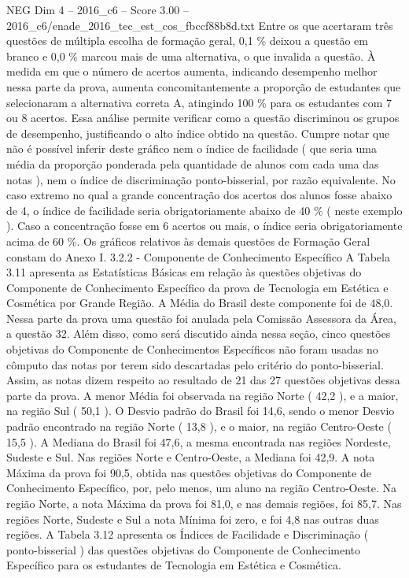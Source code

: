 \begin{textsample}{NEG Dim 4 – 2016\_c6 – Score 3.00 – 2016\_c6/enade\_2016\_tec\_est\_cos\_fbccf88b8d.txt}
Entre os que acertaram três questões de múltipla escolha de formação geral, 0,1 \% deixou a questão em branco e 0,0 \% marcou mais de uma alternativa, o que invalida a questão.
À medida em que o número de acertos aumenta, indicando desempenho melhor nessa parte da prova, aumenta concomitantemente a proporção de estudantes que selecionaram a alternativa correta A, atingindo 100 \% para os estudantes com 7 ou 8 acertos.
Essa análise permite verificar como a questão discriminou os grupos de desempenho, justificando o alto índice obtido na questão.
Cumpre notar que não é possível inferir deste gráfico nem o índice de facilidade ( que seria uma média da proporção ponderada pela quantidade de alunos com cada uma das notas ), nem o índice de discriminação ponto-bisserial, por razão equivalente.
No caso extremo no qual a grande concentração dos acertos dos alunos fosse abaixo de 4, o índice de facilidade seria obrigatoriamente abaixo de 40 \% ( neste exemplo ).
Caso a concentração fosse em 6 acertos ou mais, o índice seria obrigatoriamente acima de 60 \%.
Os gráficos relativos às demais questões de Formação Geral constam do Anexo I. 3.2.2 - Componente de Conhecimento Específico A Tabela 3.11 apresenta as Estatísticas Básicas em relação às questões objetivas do Componente de Conhecimento Específico da prova de Tecnologia em Estética e Cosmética por Grande Região.
A Média do Brasil deste componente foi de 48,0.
Nessa parte da prova uma questão foi anulada pela Comissão Assessora da Área, a questão 32.
Além disso, como será discutido ainda nessa seção, cinco questões objetivas do Componente de Conhecimentos Específicos não foram usadas no cômputo das notas por terem sido descartadas pelo critério do ponto-bisserial.
Assim, as notas dizem respeito ao resultado de 21 das 27 questões objetivas dessa parte da prova.
A menor Média foi observada na região Norte ( 42,2 ), e a maior, na região Sul ( 50,1 ).
O Desvio padrão do Brasil foi 14,6, sendo o menor Desvio padrão encontrado na região Norte ( 13,8 ), e o maior, na região Centro-Oeste ( 15,5 ).
A Mediana do Brasil foi 47,6, a mesma encontrada nas regiões Nordeste, Sudeste e Sul.
Nas regiões Norte e Centro-Oeste, a Mediana foi 42,9.
A nota Máxima da prova foi 90,5, obtida nas questões objetivas do Componente de Conhecimento Específico, por, pelo menos, um aluno na região Centro-Oeste.
Na região Norte, a nota Máxima da prova foi 81,0, e nas demais regiões, foi 85,7.
Nas regiões Norte, Sudeste e Sul a nota Mínima foi zero, e foi 4,8 nas outras duas regiões.
A Tabela 3.12 apresenta os Índices de Facilidade e Discriminação ( ponto-bisserial ) das questões objetivas do Componente de Conhecimento Específico para os estudantes de Tecnologia em Estética e Cosmética.

\end{textsample}
